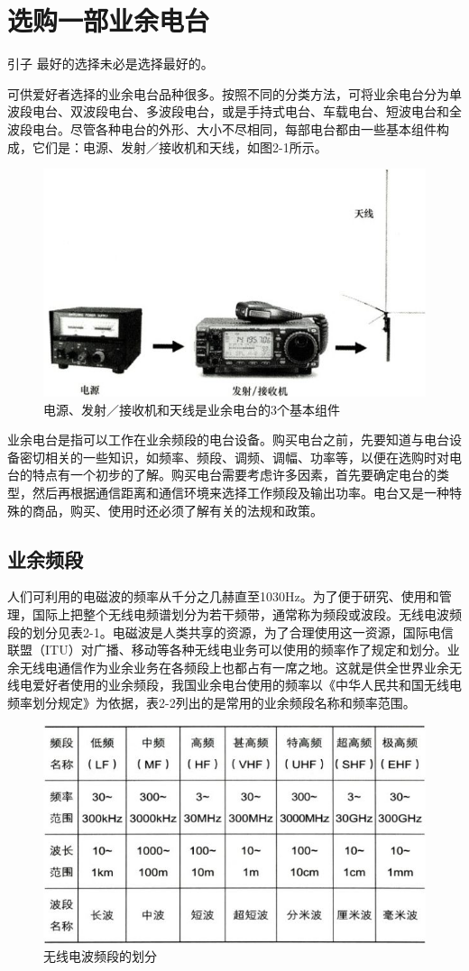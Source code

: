 \documentclass[12pt,UTF8]{ctexbook}
\begin{document}
\chapter{选购一部业余电台}

引子
最好的选择未必是选择最好的。

可供爱好者选择的业余电台品种很多。按照不同的分类方法，可将业余电台分为单波段电台、双波段电台、多波段电台，或是手持式电台、车载电台、短波电台和全波段电台。尽管各种电台的外形、大小不尽相同，每部电台都由一些基本组件构成，它们是：电源、发射／接收机和天线，如图2-1所示。

\begin{figure}[htbp]
	\centering
	\includegraphics[width=0.7\linewidth]{16}
	\caption{电源、发射／接收机和天线是业余电台的3个基本组件}
	\label{fig:1}
\end{figure}

业余电台是指可以工作在业余频段的电台设备。购买电台之前，先要知道与电台设备密切相关的一些知识，如频率、频段、调频、调幅、功率等，以便在选购时对电台的特点有一个初步的了解。购买电台需要考虑许多因素，首先要确定电台的类型，然后再根据通信距离和通信环境来选择工作频段及输出功率。电台又是一种特殊的商品，购买、使用时还必须了解有关的法规和政策。

\section{业余频段}

人们可利用的电磁波的频率从千分之几赫直至1030Hz。为了便于研究、使用和管理，国际上把整个无线电频谱划分为若干频带，通常称为频段或波段。无线电波频段的划分见表2-1。电磁波是人类共享的资源，为了合理使用这一资源，国际电信联盟（ITU）对广播、移动等各种无线电业务可以使用的频率作了规定和划分。业余无线电通信作为业余业务在各频段上也都占有一席之地。这就是供全世界业余无线电爱好者使用的业余频段，我国业余电台使用的频率以《中华人民共和国无线电频率划分规定》为依据，表2-2列出的是常用的业余频段名称和频率范围。

\begin{figure}[htbp]
	\centering
	\includegraphics[width=0.7\linewidth]{17}
	\caption{无线电波频段的划分}
	\label{fig:1}
\end{figure}
\end{document}
